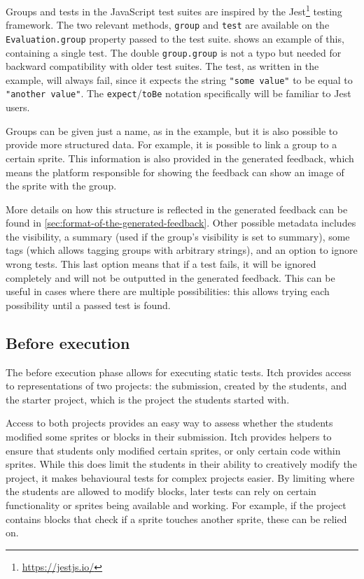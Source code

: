 \documentclass[../main]{subfiles}
\begin{document}
Groups and tests in the JavaScript test suites are inspired by the Jest\footnote{\url{https://jestjs.io/}} testing framework.
The two relevant methods, \texttt{group} and \texttt{test} are available on the \texttt{Evaluation.group} property passed to the test suite.
 shows an example of this, containing a single test.
The double \texttt{group.group} is not a typo but needed for backward compatibility with older test suites.
The test, as written in the example, will always fail, since it expects the string \texttt{"some value"} to be equal to \texttt{"another value"}.
The \texttt{expect}/\texttt{toBe} notation specifically will be familiar to Jest users.

Groups can be given just a name, as in the example, but it is also possible to provide more structured data.
For example, it is possible to link a group to a certain sprite.
This information is also provided in the generated feedback, which means the platform responsible for showing the feedback can show an image of the sprite with the group.

More details on how this structure is reflected in the generated feedback can be found in \cref{sec:format-of-the-generated-feedback}.
Other possible metadata includes the visibility, a summary (used if the group's visibility is set to summary), some tags (which allows tagging groups with arbitrary strings), and an option to ignore wrong tests.
This last option means that if a test fails, it will be ignored completely and will not be outputted in the generated feedback.
This can be useful in cases where there are multiple possibilities: this allows trying each possibility until a passed test is found.

\subsection{Before execution}\label{subsec:before-execution}

The before execution phase allows for executing static tests.
Itch provides access to representations of two projects: the submission, created by the students, and the starter project, which is the project the students started with.

Access to both projects provides an easy way to assess whether the students modified some sprites or blocks in their submission.
Itch provides helpers to ensure that students only modified certain sprites, or only certain code within sprites.
While this does limit the students in their ability to creatively modify the project, it makes behavioural tests for complex projects easier.
By limiting where the students are allowed to modify blocks, later tests can rely on certain functionality or sprites being available and working.
For example, if the project contains blocks that check if a sprite touches another sprite, these can be relied on.
\end{document}
